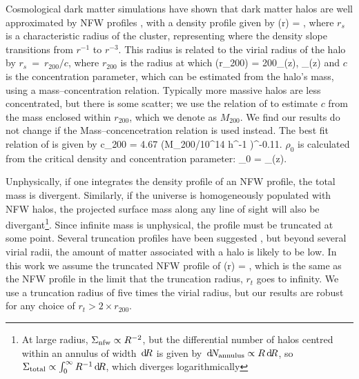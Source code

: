 \documentclass[useAMS,usenatbib]{mn2e}
\begin{document}
Cosmological dark matter simulations have shown that dark matter
halos are well approximated by NFW profiles \citep{NFW}, with a density
profile given by
\be\label{eq:rhonfw}
\rho(r) = 
,
\ee
where $r_{s}$ is a characteristic radius of the cluster, representing where
the density slope transitions from $r^{-1}$ to $r^{-3}$. This radius is related
to the virial radius of the halo by $r_{s}~=~r_{200}/c$, where $r_{200}$ is the radius at 
which 
\be
\rho(r_{200}) = 200\rho_{{}}(z),  \rho_{}(z) \equiv {}
\ee
and $c$ is the concentration parameter, which can be estimated from the halo's mass,
using a mass--concentration relation. Typically more massive halos are less concentrated,
but there is some scatter; we use the relation of \citet{Neto2007} to estimate $c$
from the mass enclosed within $r_{200}$, which we denote as $M_{200}$. We find our results do not change if the \citet{MaccioEtal2008} Mass--concencetration relation is used instead. The best fit relation of \citet{Neto2007} is given by
\be
c_{200} = 4.67 (M_{200}/10^{14} h^{-1} \Msun)^{-0.11}.
\ee
$\rho_0$ is calculated from the critical density and concentration parameter:
\be
\rho_0 = \rho_{}(z).
\ee


Unphysically, if one integrates the density profile of an NFW profile, the total mass is divergent.
Similarly, if the universe is homogeneously populated with NFW halos, the projected surface mass along any
line of sight will also be divergant\footnote{At large radius, $\Sigma_{\rm
nfw} \propto R^{-2}$, but the differential number of halos centred within an
annulus of width $\, \mathrm{d} \! R$ is given by $\, \mathrm{d} \! N_{\rm annulus} \propto R \, \mathrm{d} \! R$,
so  $\Sigma_{\rm total} \propto \int_{0}^{\infty} R^{-1} \, \mathrm{d} \! R$, which
diverges logarithmically}. Since infinite mass is unphysical, the profile must
be truncated at some point. Several truncation profiles have been suggested \citep[e.g][]{BMO}, but beyond several virial radii, the amount of matter associated with a halo is likely to be low. In this work we assume the truncated NFW profile of \citet{BMO}
\be\label{eq:bmoprofile}
\rho(r) = 
,
\ee
which is the same as the NFW profile in the limit that the truncation radius, $r_t$ goes to infinity. We use a truncation radius of five times the virial radius, but our results are robust for any choice of $r_t>2 \times r_{200}$.
\end{document}
